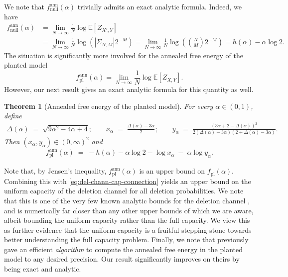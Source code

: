 \documentclass[11pt]{amsart}
\numberwithin{equation}{section}
\numberwithin{equation}{section}
\newcommand{\1}{\mathbbm{1}}
\newcommand{\E}{\mathbb{E}}
\newcommand{\fpl}{f_{\mathrm{pl}}}
\newcommand{\fplann}{f_{\mathrm{pl}}^{\mathrm{ann}}}
\newcommand{\fnullann}{f_{\mathrm{null}}^{\mathrm{ann}}}
\newtheorem{theorem}{Theorem}[section]
\theoremstyle{definition}
\begin{document}
\smallskip

We note that $\fnullann(\alpha)$ trivially admits an exact analytic formula. Indeed, we have
\begin{align*}
    f_{\text{null}}^{\text{ann}}(\alpha) &= \lim_{N\to \infty} \frac{1}{N}\log \E [Z_{X',Y}] \\
    &= \lim_{N\to \infty} \frac{1}{N}\log \left(|\Sigma_{N,M}|2^{-M} \right) = \lim_{N\to \infty} \frac{1}{N}\log \left(\binom{N}{M}2^{-M} \right) = h(\alpha) - \alpha \log 2.
\end{align*}
The situation is significantly more involved for the annealed free energy of the planted model
\[
f_{\text{pl}}^{\text{ann}}(\alpha) = \lim_{N\to \infty} \frac{1}{N}\log \E [Z_{X,Y}].
\]
However, our next result gives an exact analytic formula for this quantity as well.

\begin{theorem}[Annealed free energy of the planted model]\label{thm:main-annealed-intro}
For every $\alpha \in (0,1)$, define
\begin{align*}
    \Delta(\alpha)\;=\;\sqrt{9\alpha^{2}-4\alpha+4};\qquad x_\alpha\;=\;\frac{\Delta(\alpha)-3\alpha}{2}; \qquad y_\alpha\;=\;\frac{(3\alpha+2-\Delta(\alpha))^2}{2(\Delta(\alpha)-3\alpha)(2+\Delta(\alpha)-3\alpha)}.
\end{align*}
Then $(x_\alpha,y_\alpha)\in(0,\infty)^2$ and
\begin{align*}
    \fplann(\alpha)\;=\;-h(\alpha) - \alpha \log 2- \log x_\alpha\;-\;\alpha\log y_\alpha.
\end{align*}
\end{theorem}
Note that, by Jensen's inequality, $\fplann(\alpha)$ is an upper bound on $\fpl(\alpha).$ Combining this with \eqref{eq:del-chann-cap-connection} yields an upper bound on the uniform capacity of the deletion channel for all deletion probabilities. We note that this is one of the very few known analytic bounds for the deletion channel \cite{diggavi2001transmission, cheraghchi2019capacity}, and is numerically far closer than any other upper bounds of which we are aware, albeit bounding the uniform capacity rather than the full capacity. We view this as further evidence that the uniform capacity is a fruitful stepping stone towards better understanding the full capacity problem. Finally, we note that \cite{pernice2024mutual} previously gave an efficient \emph{algorithm} to compute the annealed free energy in the planted model to any desired precision. Our result significantly improves on theirs by being exact and analytic.
\end{document}
